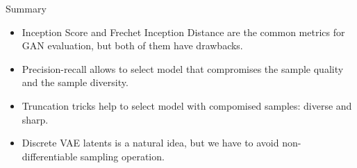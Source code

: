 \begin{frame}{Summary}
	\begin{itemize}
		\item Inception Score and Frechet Inception Distance are the common metrics for GAN evaluation, but both of them have drawbacks.
		\vfill
		\item Precision-recall allows to select model that compromises the sample quality and the sample diversity.	
		\vfill 
		\item Truncation tricks help to select model with compomised samples: diverse and sharp.
		\vfill
		\item Discrete VAE latents is a natural idea, but we have to avoid non-differentiable sampling operation.
	\end{itemize}
\end{frame}
 